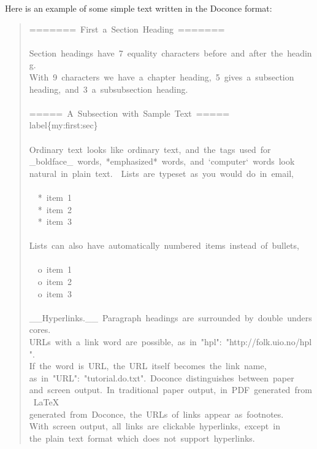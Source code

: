 \documentclass[a4paper]{article}
\begin{document}
Here is an example of some simple text written in the Doconce format:
%
\begin{quote}{\ttfamily \raggedright \noindent
=======~First~a~Section~Heading~=======\\
~\\
Section~headings~have~7~equality~characters~before~and~after~the~heading.\\
With~9~characters~we~have~a~chapter~heading,~5~gives~a~subsection\\
heading,~and~3~a~subsubsection~heading.\\
~\\
=====~A~Subsection~with~Sample~Text~=====\\
label\{my:first:sec\}\\
~\\
Ordinary~text~looks~like~ordinary~text,~and~the~tags~used~for\\
\_boldface\_~words,~*emphasized*~words,~and~`computer`~words~look\\
natural~in~plain~text.~~Lists~are~typeset~as~you~would~do~in~email,\\
~\\
~~*~item~1\\
~~*~item~2\\
~~*~item~3\\
~\\
Lists~can~also~have~automatically~numbered~items~instead~of~bullets,\\
~\\
~~o~item~1\\
~~o~item~2\\
~~o~item~3\\
~\\
\_\_Hyperlinks.\_\_~Paragraph~headings~are~surrounded~by~double~underscores.\\
URLs~with~a~link~word~are~possible,~as~in~"hpl":~"http://folk.uio.no/hpl".\\
If~the~word~is~URL,~the~URL~itself~becomes~the~link~name,\\
as~in~"URL":~"tutorial.do.txt".~Doconce~distinguishes~between~paper\\
and~screen~output.~In~traditional~paper~output,~in~PDF~generated~from~LaTeX\\
generated~from~Doconce,~the~URLs~of~links~appear~as~footnotes.\\
With~screen~output,~all~links~are~clickable~hyperlinks,~except~in\\
the~plain~text~format~which~does~not~support~hyperlinks.\\
}
\end{quote}
\end{document}
